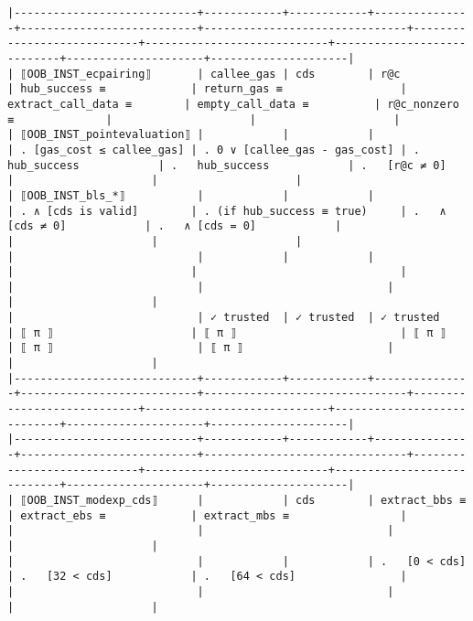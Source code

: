 \documentclass[varwidth=\maxdimen,margin=0.5cm,multi={verbatim}]{standalone}
\begin{document}
\begin{verbatim}
|----------------------------+------------+------------+---------------+---------------------------+-------------------------------+----------------------------+----------------------------+----------------------------+---------------------+---------------------|
| ⟦OOB_INST_ecpairing⟧       | callee_gas | cds        | r@c           | hub_success ≡             | return_gas ≡                  | extract_call_data ≡        | empty_call_data ≡          | r@c_nonzero ≡              |                     |                     |
| ⟦OOB_INST_pointevaluation⟧ |            |            |               | . [gas_cost ≤ callee_gas] | . 0 ∨ [callee_gas - gas_cost] | .   hub_success            | .   hub_success            | .   [r@c ≠ 0]              |                     |                     |
| ⟦OOB_INST_bls_*⟧           |            |            |               | . ∧ [cds is valid]        | . (if hub_success ≡ true)     | .   ∧ [cds ≠ 0]            | .   ∧ [cds = 0]            |                            |                     |                     |
|                            |            |            |               |                           |                               |                            |                            |                            |                     |                     |
|                            | ✓ trusted  | ✓ trusted  | ✓ trusted     | ⟦ π ⟧                     | ⟦ π ⟧                         | ⟦ π ⟧                      | ⟦ π ⟧                      | ⟦ π ⟧                      |                     |                     |
|----------------------------+------------+------------+---------------+---------------------------+-------------------------------+----------------------------+----------------------------+----------------------------+---------------------+---------------------|
|----------------------------+------------+------------+---------------+---------------------------+-------------------------------+----------------------------+----------------------------+----------------------------+---------------------+---------------------|
| ⟦OOB_INST_modexp_cds⟧      |            | cds        | extract_bbs ≡ | extract_ebs ≡             | extract_mbs ≡                 |                            |                            |                            |                     |                     |
|                            |            |            | .   [0 < cds] | .   [32 < cds]            | .   [64 < cds]                |                            |                            |                            |                     |                     |

\end{verbatim}
\end{document}
